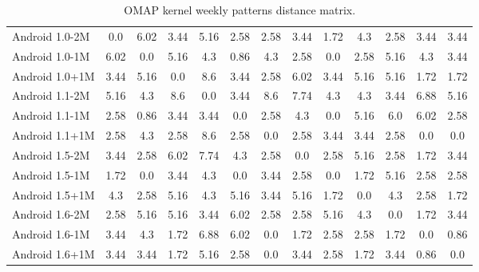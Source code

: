 \documentclass[a4paper,10pt]{article}
\numberwithin{equation}{subsection}
\begin{document}
\begin{table}
  \caption{OMAP kernel weekly patterns distance matrix.}
  \centering
  \label{tab:omap_weekly_distance}
  \begin{tabularx}{450pt}{ | X | c | c | c | c | c | c | c | c | c | c | c | c |}
  \hline                       
  &  & & & & & & & & & & & \\
  \hline 
Android 1.0-2M & 0.0 & 6.02 & 3.44 & 5.16 & 2.58 & 2.58 & 3.44 & 1.72 & 4.3 & 2.58 & 3.44 & 3.44\\ \hline                       
Android 1.0-1M & 6.02 & 0.0 & 5.16 & 4.3 & 0.86 & 4.3 & 2.58 & 0.0 & 2.58 & 5.16 & 4.3 & 3.44\\ \hline                       
Android 1.0+1M & 3.44 & 5.16 & 0.0 & 8.6 & 3.44 & 2.58 & 6.02 & 3.44 & 5.16 & 5.16 & 1.72 & 1.72\\ \hline                       
Android 1.1-2M & 5.16 & 4.3 & 8.6 & 0.0 & 3.44 & 8.6 & 7.74 & 4.3 & 4.3 & 3.44 & 6.88 & 5.16\\ \hline                       
Android 1.1-1M & 2.58 & 0.86 & 3.44 & 3.44 & 0.0 & 2.58 & 4.3 & 0.0 & 5.16 & 6.0 & 6.02 & 2.58\\ \hline                       
Android 1.1+1M & 2.58 & 4.3 & 2.58 & 8.6 & 2.58 & 0.0 & 2.58 & 3.44 & 3.44 & 2.58 & 0.0 & 0.0\\ \hline                       
Android 1.5-2M & 3.44 & 2.58 & 6.02 & 7.74 & 4.3 & 2.58 & 0.0 & 2.58 & 5.16 & 2.58 & 1.72 & 3.44\\ \hline                       
Android 1.5-1M & 1.72 & 0.0 & 3.44 & 4.3 & 0.0 & 3.44 & 2.58 & 0.0 & 1.72 & 5.16 & 2.58 & 2.58\\ \hline                       
Android 1.5+1M & 4.3 & 2.58 & 5.16 & 4.3 & 5.16 & 3.44 & 5.16 & 1.72 & 0.0 & 4.3 & 2.58 & 1.72\\ \hline                       
Android 1.6-2M & 2.58 & 5.16 & 5.16 & 3.44 & 6.02 & 2.58 & 2.58 & 5.16 & 4.3 & 0.0 & 1.72 & 3.44\\ \hline                       
Android 1.6-1M & 3.44 & 4.3 & 1.72 & 6.88 & 6.02 & 0.0 & 1.72 & 2.58 & 2.58 & 1.72 & 0.0 & 0.86\\ \hline                       
Android 1.6+1M & 3.44 & 3.44 & 1.72 & 5.16 & 2.58 & 0.0 & 3.44 & 2.58 & 1.72 & 3.44 & 0.86 & 0.0\\ 
  \hline  
  \end{tabularx}
\end{table}
\end{document}
